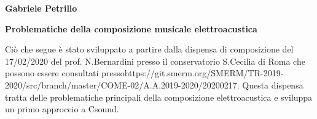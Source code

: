\documentclass[11pt]{article}
\begin{document}
\begin{minipage}{0.55\linewidth}
\vspace{0.3cm}
{\large{\textbf{\textsf{Gabriele Petrillo}}}}\\\end{minipage}

\vspace{0.3cm}
\begin{minipage}{0.95\linewidth}
\begin{center}
{\huge{\textbf{\textsf{Problematiche della composizione musicale elettroacustica}}}} \\
\end{center}
\end{minipage}
\vspace*{0.2cm}


\begin{center}
\begin{minipage}[c]{14cm}
\begin{textit}

Ciò che segue è stato sviluppato a partire dalla dispensa di composizione del 17/02/2020 del prof. N.Bernardini presso il conservatorio S.Cecilia di Roma che possono essere consultati pressohttps://git.smerm.org/SMERM/TR-2019-2020/src/branch/master/COME-02/A.A.2019-2020/20200217. Questa dispensa tratta delle problematiche principali della composizione elettroacustica e sviluppa un primo 
approccio a Csound.

\end{textit}
\end{minipage}
\end{center}
\vspace*{0.2cm}

\end{document}

